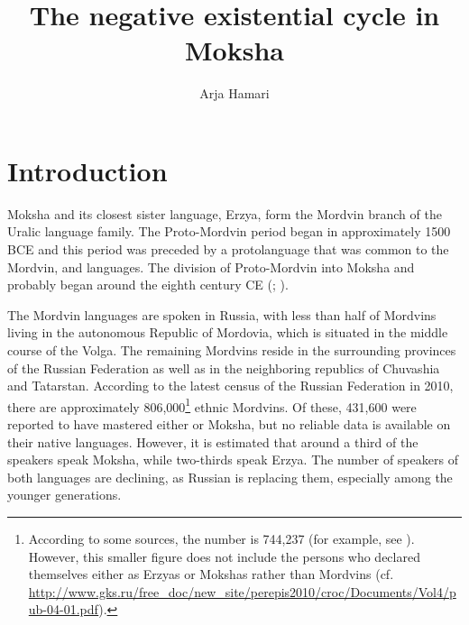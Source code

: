 \documentclass[output=paper]{langsci/langscibook}
\author{Arja Hamari\affiliation{University of Helsinki}}
\title{%
The negative existential cycle in Moksha}
\begin{document}
\section{Introduction}

Moksha and its closest sister language, Erzya, form the Mordvin branch of the Uralic language family. The Proto-Mordvin period began in approximately 1500 BCE and this period was preceded by a protolanguage that was common to the Mordvin,  and  languages. The division of Proto-Mordvin into Moksha and  probably began around the eighth century CE (\citealt[13--15]{Bartens1999}; \citealt[13–14]{Keresztes2011}).

  The Mordvin languages are spoken in Russia, with less than half of Mordvins living in the autonomous Republic of Mordovia, which is situated in the middle course of the Volga. The remaining Mordvins reside in the surrounding provinces of the Russian Federation as well as in the neighboring republics of Chuvashia and Tatarstan. According to the latest census of the Russian Federation in 2010, there are approximately 806,000\footnote{According to some sources, the number is 744,237 (for example, see \citealt{HamariAasmae2015}). However, this smaller figure does not include the persons who declared themselves either as Erzyas or Mokshas rather than Mordvins (cf. \href{http://www.gks.ru/free\_doc/new\_site/perepis2010/croc/Documents/Vol4/pub-04-01.pdf}{http://www.gks.ru/free\_doc/new\_site/perepis2010/croc/Documents/Vol4/pub-04-01.pdf}).} ethnic Mordvins. Of these, 431,600 were reported to have mastered either  or Moksha, but no reliable data is available on their native languages. However, it is estimated that around a third of the speakers speak Moksha, while two-thirds speak Erzya. The number of speakers of both languages are declining, as Russian is replacing them, especially among the younger generations.
\end{document}
